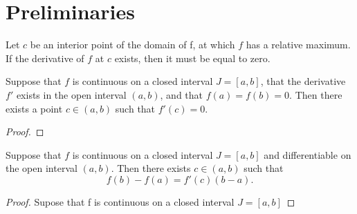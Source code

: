 \section{Preliminaries}

\begin{theorem}
    Let $c$ be an interior point of the domain of f, at which $f$ has a relative 
    maximum. If the derivative of $f$ at $c$ exists, then it must be equal to zero.
\end{theorem}


\begin{theorem}
    Suppose that $f$ is continuous on a closed interval $J = [a,b]$, that the 
    derivative $f'$ exists in the open interval $(a,b)$, and that 
    $f(a) = f(b) = 0$. Then there exists a point $c \in (a,b)$ such that 
    $f'(c) = 0$.
\end{theorem}
\begin{proof}

\end{proof}
\begin{theorem}
	Suppose that $f$ is continuous on a closed interval $J = [a,b]$ and 
	differentiable on the open interval $(a,b)$. Then there exists $c \in (a,b)$
	such that 
	$$
	    f(b) - f(a) = f'(c)(b - a).
	$$
\end{theorem}
\begin{proof}
    Supose that f is continuous on a closed interval $J=[a,b]$
\end{proof}


